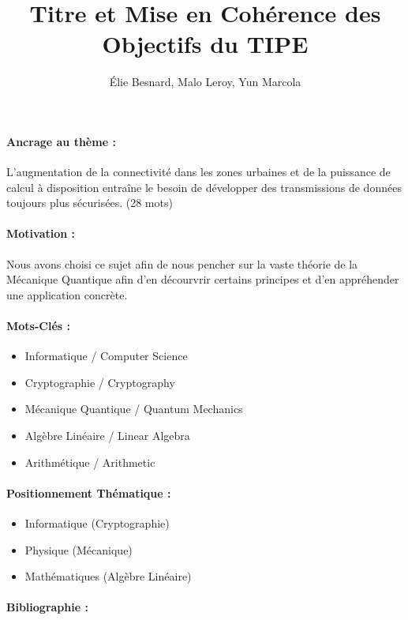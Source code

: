 \documentclass{article}
\title{Titre et Mise en Cohérence des Objectifs du TIPE}
\author{Élie Besnard, Malo Leroy, Yun Marcola}
\date{}
\begin{document}
\maketitle

\paragraph{Ancrage au thème :} L’augmentation de la connectivité dans les zones urbaines et de la puissance de calcul à disposition entraîne le besoin de développer des transmissions de données toujours plus sécurisées. \newline (28 mots) %

\paragraph{Motivation :} Nous avons choisi ce sujet afin de nous pencher sur la vaste théorie de la Mécanique Quantique afin d'en décourvrir certains principes et d'en appréhender une application concrète.

\paragraph{Mots-Clés :}

\begin{itemize}
    \item Informatique / Computer Science
    \item Cryptographie / Cryptography
    \item Mécanique Quantique / Quantum Mechanics
    \item Algèbre Linéaire / Linear Algebra
    \item Arithmétique / Arithmetic
\end{itemize}

\paragraph{Positionnement Thématique :}

\begin{itemize}
    \item Informatique (Cryptographie)
    \item Physique (Mécanique)
    \item Mathématiques (Algèbre Linéaire)
\end{itemize}

\paragraph{Bibliographie :}
\end{document}
